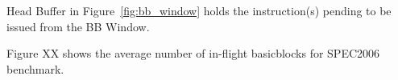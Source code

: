 Head Buffer in Figure~\ref{fig:bb_window} holds the instruction(s) pending to be
issued from the BB Window.

Figure XX shows the average number of in-flight basicblocks for SPEC2006
benchmark.




